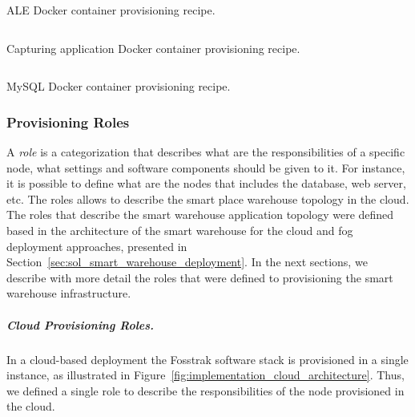 \begin{listing}[ht!]
\inputminted[frame=lines,
             framesep=3mm,
             linenos=true,
             xleftmargin=21pt,
             tabsize=4]{ruby}{./listings/ale_recipe.rb}
\caption{ALE Docker container provisioning recipe.}
\label{listing:ale_recipe}
\end{listing}

\begin{listing}[ht!]
\inputminted[frame=lines,
             framesep=3mm,
             linenos=true,
             xleftmargin=21pt,
             tabsize=4]{ruby}{./listings/capture_recipe.rb}
\caption{Capturing application Docker container provisioning recipe.}
\label{listing:capture_recipe}
\end{listing}

\begin{listing}[ht!]
\inputminted[frame=lines,
             framesep=3mm,
             linenos=true,
             xleftmargin=21pt,
             tabsize=4]{ruby}{./listings/db_recipe.rb}
\caption{MySQL Docker container provisioning recipe.}
\label{listing:db_recipe}
\end{listing}

\subsubsection{Provisioning Roles}
\label{subs:provisioning_roles}
A \textit{role} is a categorization that describes what are the responsibilities of a specific
node, what settings and software components should be given to it. For instance, it is possible
to define what are the nodes that includes the database, web server, etc. The roles allows to describe
the smart place warehouse topology in the cloud.\\

The roles that describe the smart warehouse application topology were defined based in the
architecture of the smart warehouse for the cloud and fog deployment approaches,
presented in Section~\ref{sec:sol_smart_warehouse_deployment}. In the next sections,
we describe with more detail the roles that were defined to provisioning the
smart warehouse infrastructure.

\subparagraph{Cloud Provisioning Roles.}
\label{subp:cloud_roles}
In a cloud-based deployment the Fosstrak software stack is provisioned in a single instance, as
illustrated in Figure~\ref{fig:implementation_cloud_architecture}. Thus, we defined a single role
to describe the responsibilities of the node provisioned in the cloud.\\

